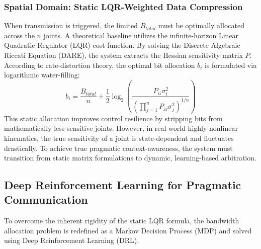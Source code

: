\subsubsection{Spatial Domain: Static LQR-Weighted Data Compression}
When transmission is triggered, the limited $B_{total}$ must be optimally allocated across the $n$ joints. A theoretical baseline utilizes the infinite-horizon Linear Quadratic Regulator (LQR) cost function. 
By solving the Discrete Algebraic Riccati Equation (DARE), the system extracts the Hessian sensitivity matrix $P$. According to rate-distortion theory, the optimal bit allocation $b_i$ is formulated via logarithmic water-filling:
\begin{equation}
    b_i = \frac{B_{total}}{n} + \frac{1}{2} \log_2 \left( \frac{P_{ii} \sigma_i^2}{\left( \prod_{j=1}^n P_{jj} \sigma_j^2 \right)^{1/n}} \right)
\end{equation}
This static allocation improves control resilience by stripping bits from mathematically less sensitive joints. 
However, in real-world highly nonlinear kinematics, the true sensitivity of a joint is state-dependent and fluctuates drastically. 
To achieve true pragmatic context-awareness, the system must transition from static matrix formulations to dynamic, learning-based arbitration.
\subsection{Deep Reinforcement Learning for Pragmatic Communication}
To overcome the inherent rigidity of the static LQR formula, the bandwidth allocation problem is redefined as a Markov Decision Process (MDP) and solved using Deep Reinforcement Learning (DRL).
